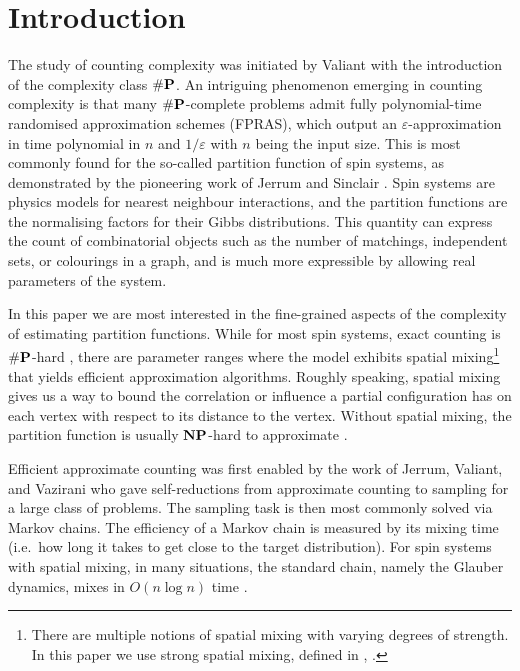 \documentclass[10pt,a4paper]{article}
\newcommand{\eps}{\varepsilon}
\newcommand{\numP}{\#{\textnormal{\textbf{P}}}}
\newcommand{\NP}{\textnormal{\textbf{NP}}}
\begin{document}
\section{Introduction}

The study of counting complexity was initiated by Valiant \cite{Val79} with the introduction of the complexity class $\numP$.
An intriguing phenomenon emerging in counting complexity is that many $\numP$-complete problems admit fully polynomial-time randomised approximation schemes (FPRAS),
which output an $\eps$-approximation in time polynomial in $n$ and $1/\eps$ with $n$ being the input size.
This is most commonly found for the so-called partition function of spin systems, as demonstrated by the pioneering work of Jerrum and Sinclair \cite{JS89,JS93}.
Spin systems are physics models for nearest neighbour interactions, and the partition functions are the normalising factors for their Gibbs distributions.
This quantity can express the count of combinatorial objects such as the number of matchings, independent sets, or colourings in a graph,
and is much more expressible by allowing real parameters of the system.

In this paper we are most interested in the fine-grained aspects of the complexity of estimating partition functions.
While for most spin systems, exact counting is $\numP$-hard \cite{CC17},
there are parameter ranges where the model exhibits spatial mixing\footnote{There are multiple notions of spatial mixing with varying degrees of strength. In this paper we use strong spatial mixing, defined in , . } that yields efficient approximation algorithms. 
Roughly speaking, spatial mixing gives us a way to bound the correlation or influence a partial configuration has on each vertex with respect to its distance to the vertex. 
Without spatial mixing, the partition function is usually $\NP$-hard to approximate \cite{SS14,GSV16,GSV15}.

Efficient approximate counting was first enabled by the work of Jerrum, Valiant, and Vazirani \cite{JVV86} 
who gave self-reductions from approximate counting to sampling for a large class of problems.
The sampling task is then most commonly solved via Markov chains.
The efficiency of a Markov chain is measured by its mixing time (i.e.~how long it takes to get close to the target distribution).
For spin systems with spatial mixing, in many situations, the standard chain, namely the Glauber dynamics, mixes in $O(n\log n)$ time \cite{CLV21,AJKPV22,CFYZ22,CE22}.
\end{document}
